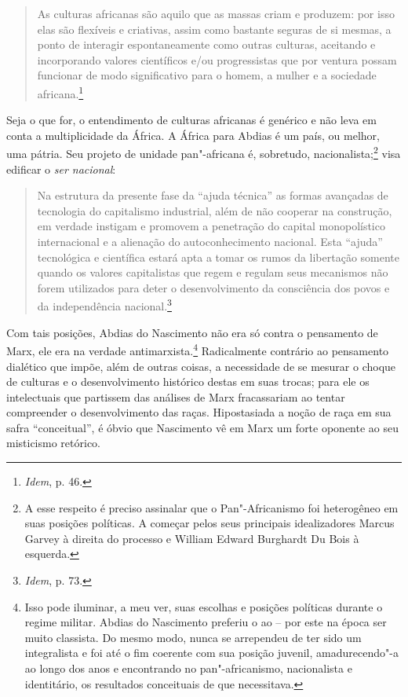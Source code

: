 \begin{quote}
As culturas africanas são aquilo que as massas criam e produzem: por
isso elas são flexíveis e criativas, assim como bastante seguras de si
mesmas, a ponto de interagir espontaneamente como outras culturas,
aceitando e incorporando valores científicos e/ou progressistas que por
ventura possam funcionar de modo significativo para o homem, a mulher e
a sociedade africana.\footnote{\emph{Idem}, p. 46.}
\end{quote}

Seja o que for, o entendimento de culturas africanas é genérico e não
leva em conta a multiplicidade da África. A África para Abdias é um
país, ou melhor, uma pátria. Seu projeto de unidade pan"-africana é,
sobretudo, nacionalista;\footnote{A esse respeito é preciso assinalar que
  o Pan"-Africanismo foi heterogêneo em suas posições políticas. A
  começar pelos seus principais idealizadores Marcus Garvey à direita do
  processo e William Edward Burghardt Du Bois à esquerda.} visa
edificar o \emph{ser nacional}:

\begin{quote}
Na estrutura da presente fase da ``ajuda técnica'' as formas avançadas
de tecnologia do capitalismo industrial, além de não cooperar na
construção, em verdade instigam e promovem a penetração do capital
monopolístico internacional e a alienação do autoconhecimento nacional.
Esta ``ajuda'' tecnológica e científica estará apta a tomar os rumos da
libertação somente quando os valores capitalistas que regem e regulam
seus mecanismos não forem utilizados para deter o desenvolvimento da
consciência dos povos e da independência nacional.\footnote{\emph{Idem}, p. 73.}
\end{quote}


Com tais posições, Abdias do Nascimento não era só contra o pensamento
de Marx, ele era na verdade antimarxista.\footnote{Isso pode iluminar, a
  meu ver, suas escolhas e posições políticas durante o regime militar.
  Abdias do Nascimento preferiu o  ao  -- por este na época ser
  muito classista. Do mesmo modo, nunca se arrependeu de ter sido um
  integralista e foi até o fim coerente com sua posição juvenil,
  amadurecendo"-a ao longo dos anos e encontrando no pan"-africanismo,
  nacionalista e identitário, os resultados conceituais de que
  necessitava.} Radicalmente contrário ao pensamento dialético que
impõe, além de outras coisas, a necessidade de se mesurar o choque de
culturas e o desenvolvimento histórico destas em suas trocas; para ele
os intelectuais que partissem das análises de Marx fracassariam ao
tentar compreender o desenvolvimento das raças. Hipostasiada a noção de
raça em sua safra ``conceitual'', é óbvio que Nascimento vê em Marx um
forte oponente ao seu misticismo retórico.

